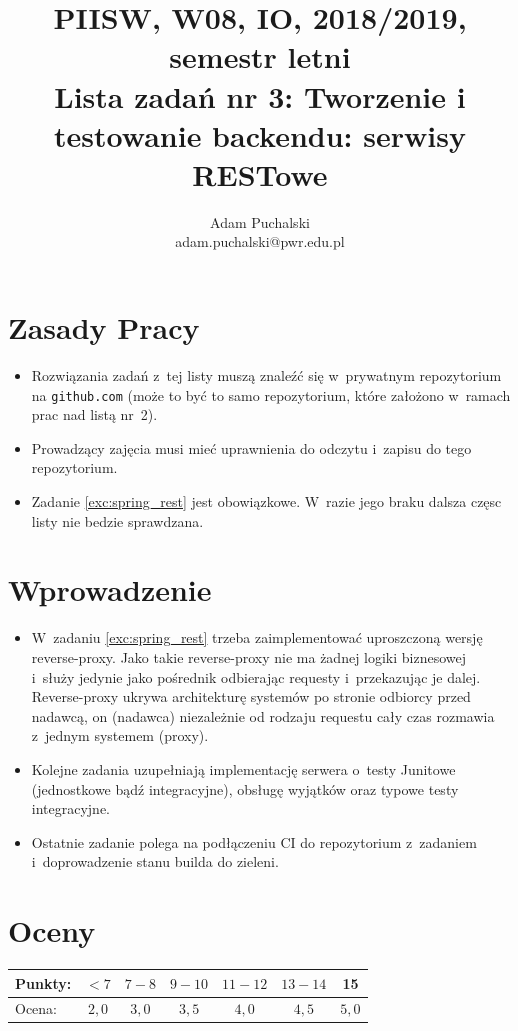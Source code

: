 \documentclass[12pt]{article}
\title{PIISW, W08, IO, 2018/2019, semestr letni\\Lista zadań nr 3: Tworzenie i testowanie backendu: serwisy RESTowe}
\author{Adam Puchalski\\ \small adam.puchalski@pwr.edu.pl}
\begin{document}
    \maketitle

    \section*{Zasady Pracy}
    \begin{itemize}
        \item Rozwiązania zadań z~tej listy muszą znaleźć się w~prywatnym repozytorium na \texttt{github.com} (może to być to samo repozytorium, które założono w~ramach prac nad listą nr~2).
        \item Prowadzący zajęcia musi mieć uprawnienia do odczytu i~zapisu do tego repozytorium.
        \item Zadanie \ref{exc:spring_rest} jest obowiązkowe. W~razie jego braku dalsza częsc listy nie bedzie sprawdzana.
    \end{itemize}

\section*{Wprowadzenie}
\begin{itemize}
        \item  W~zadaniu \ref{exc:spring_rest} trzeba zaimplementować uproszczoną wersję reverse-proxy. Jako takie reverse-proxy nie ma żadnej logiki biznesowej i~służy jedynie jako pośrednik odbierając requesty i~przekazując je dalej. Reverse-proxy ukrywa architekturę systemów po stronie odbiorcy przed nadawcą, on (nadawca) niezależnie od rodzaju requestu cały czas rozmawia z~jednym systemem (proxy).
        \item Kolejne zadania uzupełniają implementację serwera o~testy Junitowe (jednostkowe bądź integracyjne), obsługę wyjątków oraz typowe testy integracyjne.
        \item Ostatnie zadanie polega na podłączeniu CI do repozytorium z~zadaniem i~doprowadzenie stanu builda do zieleni.
\end{itemize}

    \section*{Oceny}
    \begin{tabular}{|l|c|c|c|c|c|c|}
        \hline
        Punkty: & $<7$ & $7-8$ & $9-10$ & $11-12$ & $13-14$ & 15\\
        \hline
        Ocena:  & $2,0$ & $3,0$ & $3,5$ & $4,0$ & $4,5$ & $5,0$\\
        \hline
    \end{tabular}
\end{document}
